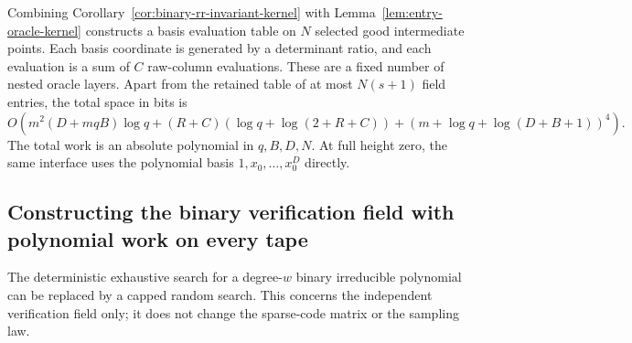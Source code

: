 \documentclass[11pt,letterpaper]{article}
\numberwithin{equation}{section}
\begin{document}
Combining Corollary~\ref{cor:binary-rr-invariant-kernel} with Lemma~\ref{lem:entry-oracle-kernel} constructs a basis evaluation table on $N$ selected good intermediate points.
Each basis coordinate is generated by a determinant ratio, and each evaluation is a sum of $C$ raw-column evaluations.
These are a fixed number of nested oracle layers.
Apart from the retained table of at most $N(s+1)$ field entries, the total space in bits is
\[
 O\!\left(
 m^2(D+mqB)\log q+
 (R+C)(\log q+\log(2+R+C))+
 (m+\log q+\log(D+B+1))^4\right).
\]
The total work is an absolute polynomial in $q,B,D,N$.
At full height zero, the same interface uses the polynomial basis $1,x_0,\ldots,x_0^D$ directly.





\subsection{Constructing the binary verification field with polynomial work on every tape}
\label{sec:bounded-binary-field}

The deterministic exhaustive search for a degree-$w$ binary irreducible polynomial can be replaced by a capped random search.
This concerns the independent verification field only; it does not change the sparse-code matrix or the sampling law.
\end{document}
